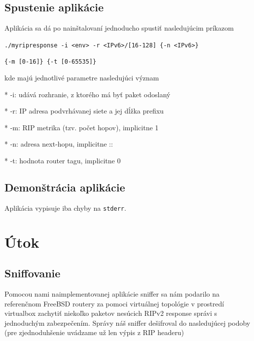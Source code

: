 \documentclass{report}
\begin{document}
	\subsection{Spustenie aplikácie}
	Aplikácia sa dá po nainštalovaní jednoducho spustiť nasledujúcim príkazom
    
    \verb|./myripresponse -i <env> -r <IPv6>/[16-128] {-n <IPv6>}|
    
    \verb|{-m [0-16]} {-t [0-65535]}|
    
    kde majú jednotlivé parametre nasledujúci význam
    
    * -i: udává rozhranie, z ktorého má byť paket odoslaný
    
    * -r: IP adresa podvrhávanej siete a jej dĺžka prefixu
    
    * -m: RIP metrika (tzv. počet hopov), implicitne 1
    
    * -n: adresa next-hopu, implicitne ::
    
    * -t: hodnota router tagu, implicitne 0
    
    \subsection{Demonštrácia aplikácie}
	
    Aplikácia vypisuje iba chyby na \verb|stderr|.
    
    \newpage
    
    \section{Útok}
    
    \subsection{Sniffovanie}
    
    Pomocou nami naimplementovanej aplikácie sniffer sa nám podarilo na referenčnom FreeBSD routery za pomoci virtuálnej topológie v prostredí virtualbox zachytiť niekoľko paketov nesúcich RIPv2 response správi s jednoduchým zabezpečením. Správy náš sniffer dešifroval do nasledujúcej podoby (pre zjednoduhšenie uvádzame už len výpis z RIP headeru)
    
\end{document}
